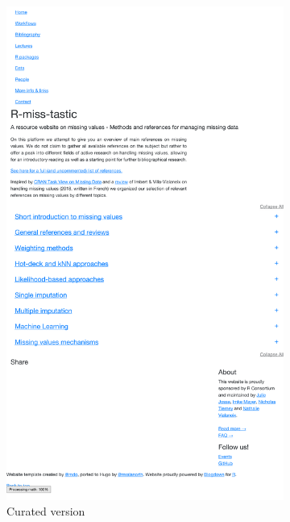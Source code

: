 \begin{figure}
\begin{center}
\begin{subfigure}[b]{0.515\textwidth}
\includegraphics[width=\textwidth]{figures/local-bibliography.pdf}
\caption{Curated version}
\end{subfigure}
\begin{subfigure}[b]{0.475\textwidth}

\end{subfigure}
\end{center}
\end{figure}
